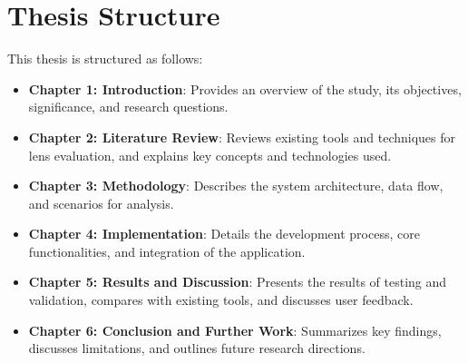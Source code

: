 \section*{Thesis Structure}
This thesis is structured as follows:
\begin{itemize}
    \item \textbf{Chapter 1: Introduction}: Provides an overview of the study, its objectives, significance, and research questions.
    \item \textbf{Chapter 2: Literature Review}: Reviews existing tools and techniques for lens evaluation, and explains key concepts and technologies used.
    \item \textbf{Chapter 3: Methodology}: Describes the system architecture, data flow, and scenarios for analysis.
    \item \textbf{Chapter 4: Implementation}: Details the development process, core functionalities, and integration of the application.
    \item \textbf{Chapter 5: Results and Discussion}: Presents the results of testing and validation, compares with existing tools, and discusses user feedback.
    \item \textbf{Chapter 6: Conclusion and Further Work}: Summarizes key findings, discusses limitations, and outlines future research directions.
\end{itemize}